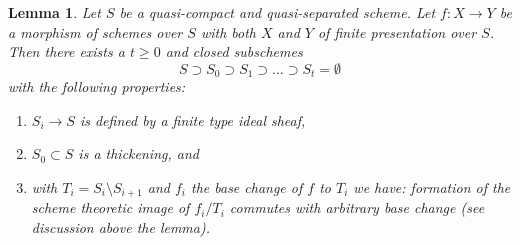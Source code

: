 \documentclass{amsart}
\theoremstyle{plain}
\newtheorem{lemma}[subsection]{Lemma}
\theoremstyle{definition}
\theoremstyle{remark}
\numberwithin{equation}{subsection}
\begin{document}
\begin{lemma}
\label{lemma-base-change-scheme-theoretic-image}
Let $S$ be a quasi-compact and quasi-separated scheme.
Let $f : X \to Y$ be a morphism of schemes over $S$ with
both $X$ and $Y$ of finite presentation over $S$.
Then there exists a $t \geq 0$ and closed subschemes
$$
S \supset S_0 \supset S_1 \supset \ldots \supset S_t = \emptyset
$$
with the following properties:
\begin{enumerate}
\item $S_i \to S$ is defined by a finite type ideal sheaf,
\item $S_0 \subset S$ is a thickening, and
\item with $T_i = S_i \setminus S_{i + 1}$ and $f_i$ the base
change of $f$ to $T_i$ we have:
formation of the scheme theoretic image of $f_i/T_i$
commutes with arbitrary base change (see discussion above the lemma).
\end{enumerate}
\end{lemma}
\end{document}
